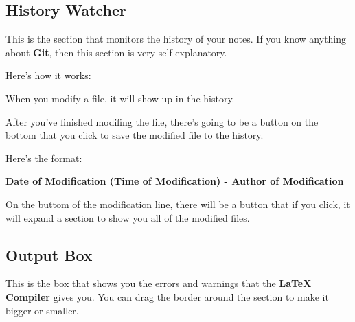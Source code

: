 
\subsection{History Watcher}
\label{sub_sec:history_watcher}

This is the section that monitors the history of your notes. If you know
anything about \textbf{Git}, then this section is very self-explanatory.

Here's how it works:

When you modify a file, it will show up in the history.

After you've finished modifing the file, there's going to be a button on the
bottom that you click to save the modified file to the history.

Here's the format:

\textbf{Date of Modification (Time of Modification) - Author of Modification}

On the buttom of the modification line, there will be a button that if you
click, it will expand a section to show you all of the modified files.


\subsection{Output Box}
\label{sub_sec:output_box}

This is the box that shows you the errors and warnings that the
\textbf{LaTeX Compiler} gives you.
You can drag the border around the section to make it bigger or smaller.




\newpage
